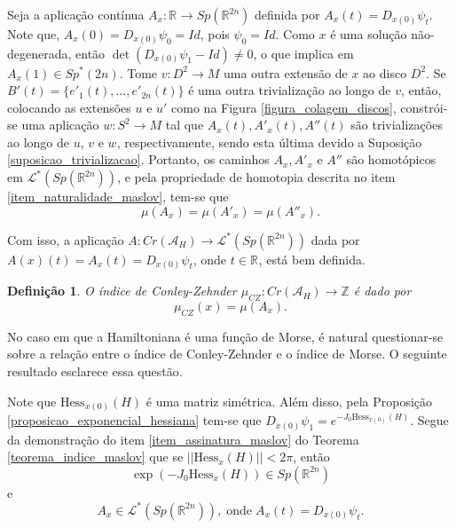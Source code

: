 \documentclass[12pt]{book}
\newtheorem{definicao}[teorema]{Definição}
\newcommand{\caminhosespeciais}[1]{\mathcal{L}^{*}(#1)}
\newcommand{\caminhos}{\mathcal{L}}
\newcommand{\dominioMaslov}{\caminhos^{*}(\gruposimpletico{\real{2n}})}
\newcommand{\estruturacomplexa}{J_{0}}
\newcommand{\funcionalH}{\mathcal{A}_{H}}
\newcommand{\gruposimpletico}[1]{Sp(#1)}
\newcommand{\gruposimpleticonaodegenerado}[1]{Sp^{#1}(2n)}
\newcommand{\hessianaponto}[2]{\text{Hess}_{#1}(#2)}
\newcommand{\iconley}[1]{\iconleyabrev(#1)}
\newcommand{\iconleyabrev}{\mu_{CZ}}
\newcommand{\inteiros}{\mathbb{Z}}
\newcommand{\norma}[1]{||#1||}
\newcommand{\pontoscriticos}[1]{\textit{Cr}(#1)}
\newcommand{\real}[1]{\mathbb{R}^{#1}}
\newcommand{\reta}{\real{}}
\begin{document}
	Seja a aplicação contínua $A_{x}:\reta \to \gruposimpletico{\real{2n}}$ definida por $A_{x}(t) = D_{x(0)}\psi_{t}$. Note que, $A_{x}(0) = D_{x(0)}\psi_{0}=Id$, pois $\psi_{0}=Id$. Como $x$ é uma solução não-degenerada, então $\det(D_{x(0)}\psi_{1}-Id) \neq 0$, o que implica em $A_{x}(1)\in \gruposimpleticonaodegenerado{*}$. Tome $v:D^{2}\to M$ uma outra extensão de $x$ ao disco $D^{2}$. Se $B'(t)= \{e'_{1}(t), \dots, e'_{2n}(t)\}$ é uma outra trivialização ao longo de $v$, então, colocando as extensões $u$ e $u'$ como na Figura \ref{figura_colagem_discos}, constrói-se uma aplicação $w:S^{2}\to M$ tal que $A_{x}(t), A'_{x}(t), A''(t)$ são trivializações ao longo de $u$, $v$ e $w$, respectivamente, sendo esta última devido a Suposição \ref{suposicao_trivializacao}. Portanto, os caminhos $A_{x}, A'_{x}$ e $ A''$ são homotópicos em $\dominioMaslov$, e pela propriedade de homotopia descrita no item \ref{item_naturalidade_maslov}, tem-se que 
	$$
	\mu(A_{x}) = \mu(A'_{x}) = \mu(A''_{x}).
	$$
	
	Com isso, a aplicação $A: \pontoscriticos{\funcionalH} \to \caminhosespeciais{\gruposimpletico{\real{2n}}}$ dada por $A(x)(t) =A_{x}(t)= D_{x(0)}\psi_{t}$, onde $t \in \reta$, está bem definida.
	
	\begin{definicao}
		O índice de Conley-Zehnder $\iconleyabrev:\pontoscriticos{\funcionalH} \to \inteiros$ é dado por 
		$$
		\iconley{x} = \mu(A_{x}).
		$$
	\end{definicao}
	
	No caso em que a Hamiltoniana é uma função de Morse, é natural questionar-se sobre a relação entre o índice de Conley-Zehnder e o índice de Morse. O seguinte resultado esclarece essa questão.
	
	Note que $\hessianaponto{x(0)}{H}$ é uma matriz simétrica. Além disso, pela Proposição \ref{proposicao_exponencial_hessiana} tem-se que $D_{x(0)}\psi_{1}= e^{-\estruturacomplexa \hessianaponto{x(0)}{H}}$. Segue da demonstração do item \ref{item_assinatura_maslov} do Teorema \ref{teorema_indice_maslov} que se $\norma{\hessianaponto{x}{H}}<2\pi$, então 
	$$
	\exp(-\estruturacomplexa \hessianaponto{x}{H}) \in \gruposimpletico{\real{2n}}
	$$
	e
	$$ 
	A_{x}\in \caminhosespeciais{\gruposimpletico{\real{2n}}},\;\text{onde}\; A_{x}(t) = D_{x(0)}\psi_{t}.
	$$ 
	
\end{document}
